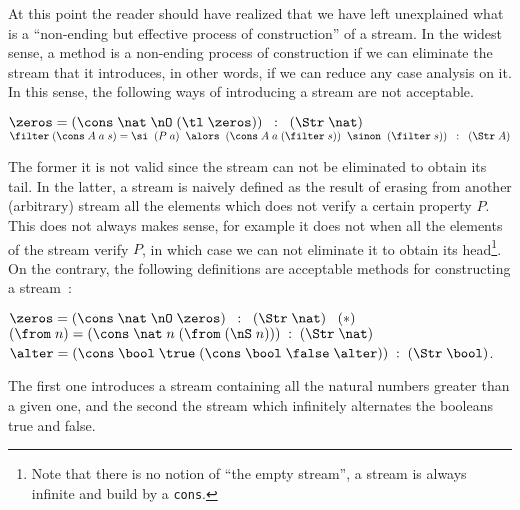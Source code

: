 At this point the reader should have realized that we have left unexplained
what is a ``non-ending but effective process of
construction'' of a stream. In the widest sense, a 
method is a non-ending process of construction if we can eliminate the
stream that it introduces, in other words, if we can reduce
any case analysis on it. In this sense, the following ways of 
introducing a stream are not acceptable. 
\begin{center}
$\zeros = (\cons\;\nat\;\nO\;(\tl\;\zeros))\;\;:\;\;(\Str\;\nat)$\\[12pt]
$\filter\;(\cons\;A\;a\;s) = \si\;\;(P\;a)\;\;\alors\;\;(\cons\;A\;a\;(\filter\;s))\;\;\sinon\;\;(\filter\;s) )\;\;:\;\;(\Str\;A)$
\end{center}
\noindent The former it is not valid since the stream can not be eliminated 
to obtain its tail. In the latter, a stream is naively defined as
the result of erasing from another (arbitrary) stream 
all the elements which does not verify a certain property $P$. This
does not always makes sense, for example it does not when all the elements
of the stream verify $P$, in which case we can not eliminate it to
obtain its head\footnote{Note that there is no notion of ``the empty
stream'', a stream is always infinite and build by a \texttt{cons}.}. 
On the contrary, the following definitions are acceptable methods for
constructing a stream~:
\begin{center}
$\zeros = (\cons\;\nat\;\nO\;\zeros)\;\;:\;\;(\Str\;\nat)\;\;\;(*)$\\[12pt]
$(\from\;n) = (\cons\;\nat\;n\;(\from\;(\nS\;n)))\;:\;(\Str\;\nat)$\\[12pt]
$\alter  = (\cons\;\bool\;\true\;(\cons\;\bool\;\false\;\alter))\;:\;(\Str\;\bool)$.
\end{center}
\noindent The first one introduces a stream containing all the natural numbers
greater than a given one, and the second the stream which infinitely
alternates the booleans true and false.


